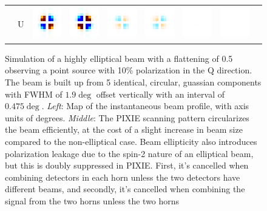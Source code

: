 \documentclass{article}
\begin{document}
\begin{figure}
\begin{tabular}{m{35mm}rm{11mm}m{11mm}m{11mm}m{11mm}m{11mm}m{11mm}m{20mm}}
		&
		U &
		\includegraphics[height=14mm]{plots/ellip_mismatch_srcs_sb_det0_crop_2.png} &
		\includegraphics[height=14mm]{plots/ellip_mismatch_srcs_sb_det1_crop_2.png} &
		\includegraphics[height=14mm]{plots/ellip_mismatch_srcs_sb_det01_crop_2.png} &
		\includegraphics[height=14mm]{plots/ellip_mismatch_srcs_sb_det23_crop_2.png} &
		\includegraphics[height=14mm]{plots/ellip_mismatch_srcs_sb_tot_crop_2.png} &
		\includegraphics[height=14mm]{plots/circular_srcs_sb_tot_crop_2.png} &
	\end{tabular}
	\caption{Simulation of a highly elliptical beam with a flattening of 0.5
	observing a point source with 10\% polarization in the Q direction. The
	beam is built up from 5 identical, circular, guassian components
	with FWHM of $1.9\deg$ offset
	vertically with an interval of $0.475\deg$. \emph{Left}:
	Map of the instantaneous beam profile, with axis units of degrees. \emph{Middle}:
	The PIXIE scanning pattern circularizes the beam efficiently, at the cost
	of a slight increase in beam size compared to the non-elliptical case.
	Beam ellipticity also introduces polarization leakage due to the spin-2
	nature of an elliptical beam, but this is doubly suppressed in PIXIE.
	First, it's cancelled when combining detectors in each horn unless
	the two detectors have different beams, and secondly, it's cancelled
	when combining the signal from the two horns unless the two horns
}
\end{figure}
\end{document}
